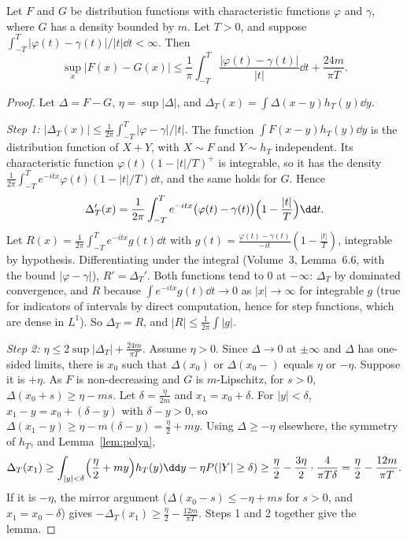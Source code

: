 \begin{lemma}\label{lem:smoothing}
Let $F$ and $G$ be distribution functions with characteristic functions $\varphi$ and $\gamma$, where $G$ has a density bounded by $m$. Let $T>0$, and
suppose $\int_{-T}^T|\varphi(t)-\gamma(t)|/|t|\dd t<\infty$. Then
\[
\sup_x|F(x)-G(x)|\le\frac1\pi\int_{-T}^T\frac{|\varphi(t)-\gamma(t)|}{|t|}\dd t+\frac{24m}{\pi T}.
\]
\end{lemma}
\begin{proof}
Let $\Delta=F-G$, $\eta=\sup|\Delta|$, and $\Delta_T(x)=\int\Delta(x-y)h_T(y)\dd y$.

\emph{Step 1: $|\Delta_T(x)|\le\frac1{2\pi}\int_{-T}^T|\varphi-\gamma|/|t|$.} The function $\int F(x-y)h_T(y)\dd y$ is the distribution function of
$X+Y$, with $X\sim F$ and $Y\sim h_T$ independent. Its characteristic function $\varphi(t)(1-|t|/T)^+$ is integrable, so it has the density
$\frac1{2\pi}\int_{-T}^Te^{-itx}\varphi(t)(1-|t|/T)\dd t$, and the same holds for $G$. Hence
\[
\Delta_T'(x)=\frac1{2\pi}\int_{-T}^Te^{-itx}\bigl(\varphi(t)-\gamma(t)\bigr)\Bigl(1-\frac{|t|}T\Bigr)\dd t.
\]
Let $R(x)=\frac1{2\pi}\int_{-T}^Te^{-itx}g(t)\dd t$ with $g(t)=\frac{\varphi(t)-\gamma(t)}{-it}(1-\frac{|t|}T)$, integrable by hypothesis. Differentiating
under the integral (Volume~3, Lemma~6.6, with the bound $|\varphi-\gamma|$), $R'=\Delta_T'$. Both functions tend to $0$ at $-\infty$: $\Delta_T$ by
dominated convergence, and $R$ because $\int e^{-itx}g(t)\dd t\to0$ as $|x|\to\infty$ for integrable $g$ (true for indicators of intervals by direct
computation, hence for step functions, which are dense in $L^1$). So $\Delta_T=R$, and $|R|\le\frac1{2\pi}\int|g|$.

\emph{Step 2: $\eta\le2\sup|\Delta_T|+\frac{24m}{\pi T}$.} Assume $\eta>0$. Since $\Delta\to0$ at $\pm\infty$ and $\Delta$ has one-sided limits, there is $x_0$
such that $\Delta(x_0)$ or $\Delta(x_0-)$ equals $\eta$ or $-\eta$. Suppose it is $+\eta$. As $F$ is non-decreasing and $G$ is $m$-Lipschitz, for $s>0$,
$\Delta(x_0+s)\ge\eta-ms$. Let $\delta=\frac\eta{2m}$ and $x_1=x_0+\delta$. For $|y|<\delta$, $x_1-y=x_0+(\delta-y)$ with $\delta-y>0$, so
$\Delta(x_1-y)\ge\eta-m(\delta-y)=\frac\eta2+my$. Using $\Delta\ge-\eta$ elsewhere, the symmetry of $h_T$, and Lemma~\ref{lem:polya},
\[
\Delta_T(x_1)\ge\int_{|y|<\delta}\Bigl(\frac\eta2+my\Bigr)h_T(y)\dd y-\eta P(|Y|\ge\delta)\ge\frac\eta2-\frac{3\eta}2\cdot\frac4{\pi T\delta}=\frac\eta2-\frac{12m}{\pi T}.
\]
If it is $-\eta$, the mirror argument ($\Delta(x_0-s)\le-\eta+ms$ for $s>0$, and $x_1=x_0-\delta$) gives $-\Delta_T(x_1)\ge\frac\eta2-\frac{12m}{\pi T}$.
Steps 1 and 2 together give the lemma.
\end{proof}

